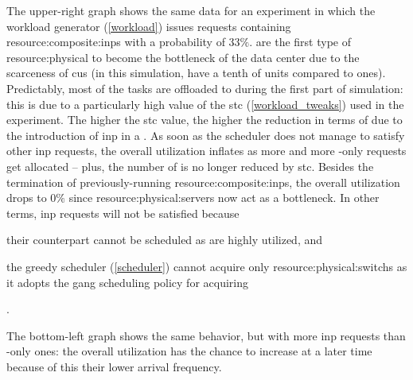 The upper-right graph shows the same data for an experiment in which the workload generator (\autoref{workload}) issues  requests containing \glspl{resource:composite:inp} with a probability of $33\%$.
 are the first type of \gls{resource:physical} to become the bottleneck of the data center due to the scarceness of \glspl{cu} (in this simulation,  have a tenth of  units compared to  ones).
Predictably, most of the tasks are offloaded to  during the first part of simulation: this is due to a particularly high value of the \gls{stc} (\autoref{workload_tweaks}) used in the experiment.
The higher the \gls{stc} value, the higher the reduction in terms of  due to the introduction of \gls{inp} in a .
As soon as the scheduler does not manage to satisfy other \gls{inp} requests, the overall  utilization inflates as more and more -only requests get allocated -- plus, the number of  is no longer reduced by \gls{stc}.
Besides the termination of previously-running \glspl{resource:composite:inp}, the overall  utilization drops to $0\%$ since \glspl{resource:physical:server} now act as a bottleneck.
In other terms, \gls{inp} requests will not be satisfied because
\begin{mylist}
    \item their  counterpart cannot be scheduled as  are highly utilized, and
    \item the greedy scheduler (\autoref{scheduler}) cannot acquire only \glspl{resource:physical:switch} as it adopts the gang scheduling policy for acquiring 
\end{mylist}.

The bottom-left graph shows the same behavior, but with more \gls{inp} requests than -only ones:
the overall  utilization has the chance to increase at a later time because of this their lower arrival frequency.

